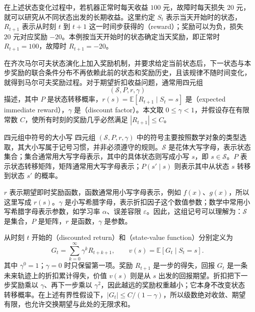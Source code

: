 \documentclass[UTF8]{ctexart}
\begin{document}
在上述状态变化过程中，若机器正常时每天收益 $100$ 元，故障时每天损失 $20$ 元，就可以研究从不同状态出发的长期收益。这里约定 $S_t$ 表示当天开始时的状态，$R_{t+1}$ 表示从时刻 $t$ 到 $t+1$ 这一时间步获得的（reward）；奖励可以为负，损失 $20$ 元对应奖励 $-20$。本例按当天开始时的状态确定当天奖励，即正常时 $R_{t+1}=100$，故障时 $R_{t+1}=-20$。

\begin{definition}[马尔可夫奖励过程]
在齐次马尔可夫状态演化上加入奖励机制，并要求给定当前状态后，下一状态与本步奖励的联合条件分布不再依赖此前的状态和奖励历史，且该规律不随时间变化，就得到马尔可夫奖励过程。对于期望折扣收益问题，通常用四元组
\[
  (\mathcal S,P,r,\gamma)
\]
描述，其中 $P$ 是状态转移概率，$r(s)=\mathbb E[R_{t+1}\mid S_t=s]$ 是（expected immediate reward），$\gamma$ 是（discount factor）。本文取 $0\leq\gamma<1$，并假设存在有限常数 $C$，使所有时刻的奖励几乎必然满足 $|R_{t+1}|\leq C$。
\end{definition}

\begin{remarkbox}[label={rem:markov-three-symbol-conventions}]{四元组中符号的大小写}
四元组 $(\mathcal S,P,r,\gamma)$ 中的符号主要按照数学对象的类型选取，其大小写属于记号习惯，并非必须遵守的规则。$\mathcal S$ 是花体大写字母，表示状态集合；集合通常用大写字母表示，其中的具体状态则写成小写 $s$，即 $s\in\mathcal S$。$P$ 表示状态转移矩阵，矩阵通常用大写字母表示；$P(s'\mid s)$ 则表示其中从状态 $s$ 转移到状态 $s'$ 的概率。

\tcblower
$r$ 表示期望即时奖励函数，函数通常用小写字母表示，例如 $f(x)$、$g(x)$，所以这里写成 $r(s)$。$\gamma$ 是小写希腊字母，表示折扣因子这个数值参数；数学中常用小写希腊字母表示参数，如学习率 $\alpha$、误差容限 $\varepsilon$。因此，这组记号可以理解为：$\mathcal S$ 是集合，$P$ 是矩阵，$r$ 是函数，$\gamma$ 是参数。
\end{remarkbox}

从时刻 $t$ 开始的（discounted return）和（state-value function）分别定义为
\begin{equation}
  G_t=\sum_{k=0}^{\infty}\gamma^kR_{t+k+1},
  \qquad
  v(s)=\mathbb E[G_t\mid S_t=s].
  \label{eq:markov-three-return}
\end{equation}
其中 $\gamma^0=1$；$\gamma=0$ 时只保留第一项。奖励 $R_{t+1}$ 是一步的得失，回报 $G_t$ 是一条未来轨迹上的折扣累计得失，价值 $v(s)$ 则是从 $s$ 出发的回报期望。折扣把下一步奖励乘以 $\gamma$、再下一步乘以 $\gamma^2$，因此越远的奖励权重越小；它本身不改变状态转移概率。在上述有界性假设下，$|G_t|\leq C/(1-\gamma)$，所以级数绝对收敛、期望有限，也允许交换期望与此处的无限求和。
\end{document}
